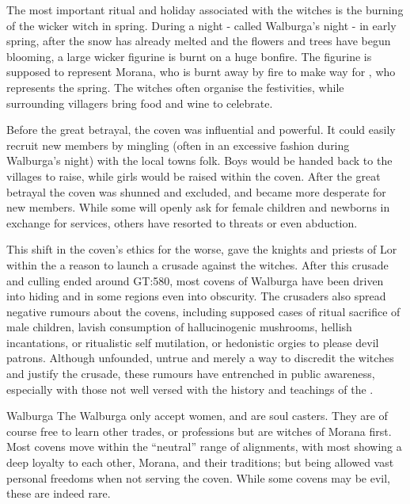The most important ritual and holiday associated with the witches is the burning
of the wicker witch in spring. During a night - called Walburga's night - in
early spring, after the snow has already melted and the flowers and trees have
begun blooming, a large wicker figurine is burnt on a huge bonfire. The figurine
is supposed to represent Morana, who is burnt away by fire to make way for
, who represents the spring. The witches often organise the
festivities, while surrounding villagers bring food and wine to celebrate.

Before the great betrayal, the coven was influential and powerful. It could
easily recruit new members by mingling (often in an excessive fashion during
Walburga's night) with the local towns folk. Boys would be handed back to the
villages to raise, while girls would be raised within the coven. After the
great betrayal the coven was shunned and excluded, and became more desperate
for new members. While some will openly ask for female children and newborns
in exchange for services, others have resorted to threats or even abduction.

This shift in the coven's ethics for the worse, gave the knights and
priests of Lor within the  a reason to
launch a crusade against the witches. After this crusade and culling ended
around GT:580, most covens of Walburga have been driven into hiding and in
some regions even into obscurity. The crusaders also spread negative rumours
about the covens, including supposed cases of ritual sacrifice of male children,
lavish consumption of hallucinogenic mushrooms, hellish incantations, or
ritualistic self mutilation, or hedonistic orgies to please devil patrons.
Although unfounded, untrue and merely a way to discredit the witches and
justify the crusade, these rumours have entrenched in public awareness,
especially with those not well versed with the history and teachings of the
.


\begin{35e}{Walburga}
  The Walburga only accept women, and are soul casters. They are of course free
  to learn other trades, or professions but are witches of Morana first. Most
  covens move within the ``neutral'' range of alignments, with most showing a
  deep loyalty to each other, Morana, and their traditions; but being allowed
  vast personal freedoms when not serving the coven. While some covens may be
  evil, these are indeed rare.
\end{35e}
